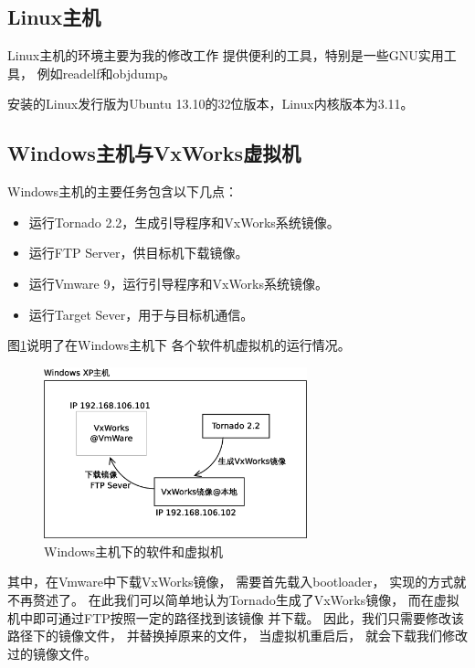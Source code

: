 \subsection{Linux主机}

Linux主机的环境主要为我的修改工作
提供便利的工具，特别是一些GNU实用工具，
例如readelf和objdump。

安装的Linux发行版为Ubuntu 13.10的32位版本，Linux内核版本为3.11。

\subsection{Windows主机与VxWorks虚拟机}

Windows主机的主要任务包含以下几点：

\begin{itemize}
  \item 运行Tornado 2.2，生成引导程序和VxWorks系统镜像。
  \item 运行FTP Server，供目标机下载镜像。
  \item 运行Vmware 9，运行引导程序和VxWorks系统镜像。
  \item 运行Target Sever，用于与目标机通信。
\end{itemize}

图\ref{win}说明了在Windows主机下
各个软件机虚拟机的运行情况。

\begin{figure}[h!]
    \centering
    \includegraphics[width=0.68\textwidth]{figure/win.eps}
    \caption{Windows主机下的软件和虚拟机}
    \label{win}
\end{figure}

其中，在Vmware中下载VxWorks镜像，
需要首先载入bootloader，
实现的方式就不再赘述了。
在此我们可以简单地认为Tornado生成了VxWorks镜像，
而在虚拟机中即可通过FTP按照一定的路径找到该镜像
并下载。
因此，我们只需要修改该路径下的镜像文件，
并替换掉原来的文件，
当虚拟机重启后，
就会下载我们修改过的镜像文件。

